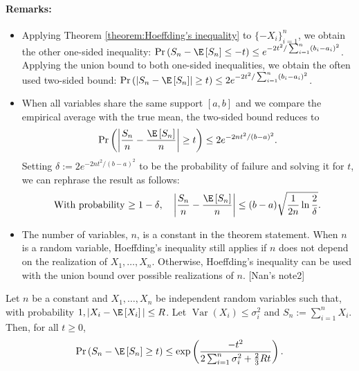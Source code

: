 \paragraph{Remarks:}
\begin{itemize}
    \item Applying Theorem \ref{theorem:Hoeffding's inequality} to $\{-X_i\}_{i=1}^n$, we obtain the other one-sided inequality:
    $\Pr\left(S_n-\E\left[S_n\right] \leq-t\right) \leq e^{-2 t^2 / \sum_{i=1}^n\left(b_i-a_i\right)^2}$.
    Applying the union bound to both one-sided inequalities, we obtain the often used two-sided bound:
    $\Pr\left(\left|S_n-\E\left[S_n\right]\right| \geq t\right) \leq 2 e^{-2 t^2 / \sum_{i=1}^n\left(b_i-a_i\right)^2}$.
    \item When all variables share the same support $[a,b]$ and we compare the empirical average with the true mean, the two-sided bound reduces to
    \begin{align*}
        \Pr\left(\left|\frac{S_n}{n}-\frac{\E\left[S_n\right]}{n}\right| \geq t\right) \leq 2 e^{-2 n t^2 / \left(b-a\right)^2}.
    \end{align*}
    Setting $\delta:=2 e^{-2 n t^2 / \left(b-a\right)^2}$ to be the probability of failure and solving it for $t$, we can rephrase the result as follows: 
    \begin{align*}
        \text{With probability $\geq1-\delta$}, \quad \left|\frac{S_n}{n}-\frac{\E\left[S_n\right]}{n}\right| \leq(b-a) \sqrt{\frac{1}{2 n} \ln \frac{2}{\delta}}.
    \end{align*}
    \item The number of variables, $n$, is a constant in the theorem statement. When $n$ is a random variable, Hoeffding's inequality still applies if $n$ does not depend on the realization of $X_1, \ldots, X_n$. Otherwise, Hoeffding's inequality can be used with the union bound over possible realizations of $n$.
    [Nan's note2]
\end{itemize}

\begin{theorem}
\label{theorem:Bernstein's inequality}
Let $n$ be a constant and $X_1, \ldots, X_n$ be independent random variables such that, with probability $1, |X_i- \E\left[X_i\right] | \leq R$. Let $\operatorname{Var}\left(X_i\right) \leq \sigma_i^2$ and $S_n:=\sum_{i=1}^n X_i$. Then, for all $t \geq 0$,
\begin{align*}
    \Pr\left(S_n-\E\left[S_n\right] \geq t\right) \leq \exp \left(\frac{-t^2}{2 \sum_{i=1}^n \sigma_i^2+\frac{2}{3} R t}\right)
    .
\end{align*}

\end{theorem}

